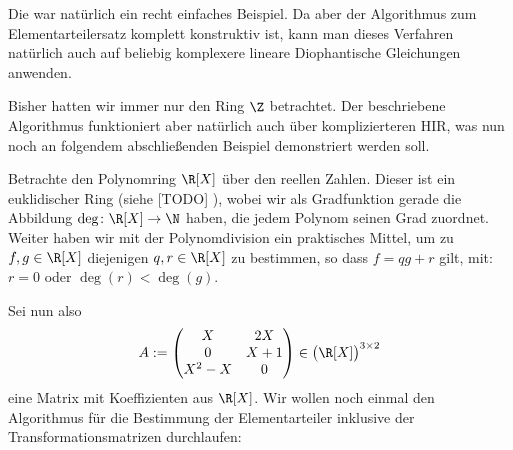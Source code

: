 Die war natürlich ein recht einfaches Beispiel. Da aber der Algorithmus zum
Elementarteilersatz komplett konstruktiv ist, kann man dieses Verfahren
natürlich auch auf beliebig komplexere lineare Diophantische Gleichungen
anwenden.

Bisher hatten wir immer nur den Ring $\Z$ betrachtet. Der beschriebene
Algorithmus funktioniert aber natürlich auch über komplizierteren HIR, was nun
noch an folgendem abschließenden Beispiel demonstriert werden soll.

\begin{thBeisp}
    Betrachte den Polynomring $\R[X]$ über den reellen Zahlen. Dieser ist ein
    euklidischer Ring (siehe [TODO] %
    ), wobei wir als Gradfunktion gerade die Abbildung $\deg\colon\R[X]\to\N$
    haben, die jedem Polynom seinen Grad zuordnet. Weiter haben wir mit der
    Polynomdivision ein praktisches Mittel, um zu $f,g\in\R[X]$ diejenigen
    $q,r\in\R[X]$ zu bestimmen, so dass $f = qg+r$ gilt, mit: $r=0$ oder
    $\deg(r)<\deg(g)$.
    
    Sei nun also
    \[ A := \Matrix{ X      &  2X   \\
                     0      &  X+1  \\
                     X^2-X  &  0     }  
    \in \bigl(\R[X]\bigr)^{3\times2}
    \]
    eine Matrix mit Koeffizienten aus $\R[X]$. Wir wollen noch einmal den
    Algorithmus für die Bestimmung der Elementarteiler inklusive der
    Transformationsmatrizen durchlaufen:
    

\end{thBeisp}
